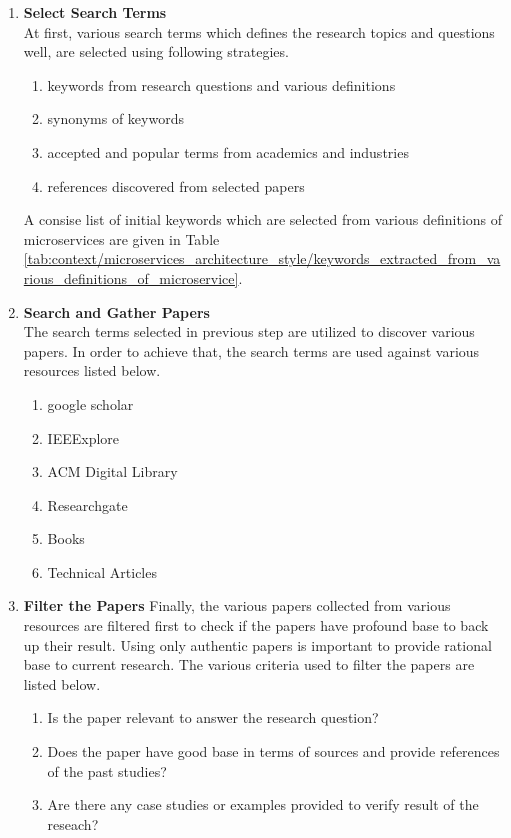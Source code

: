 \begin{enumerate}
\item \textbf{Select Search Terms}\\
At first, various search terms which defines the research topics and questions well, are selected using following strategies.
\begin{enumerate}
\item keywords from research questions and various definitions
\item synonyms of keywords
\item accepted and popular terms from academics and industries
\item references discovered from selected papers
\end{enumerate}
A consise list of initial keywords which are selected from various definitions of microservices are given in Table \ref{tab:context/microservices_architecture_style/keywords_extracted_from_various_definitions_of_microservice}.
\item \textbf{Search and Gather Papers}\\
The search terms selected in previous step are utilized to discover various papers. In order to achieve that, the search terms are used against various resources listed below.
\begin{enumerate}
\item google scholar
\item IEEExplore
\item ACM Digital Library
\item Researchgate
\item Books
\item Technical Articles
\end{enumerate}
\item \textbf{Filter the Papers}
Finally, the various papers collected from various resources are filtered first to check if the papers have profound base to back up their result. Using only authentic papers is important to provide rational base to current research. The various criteria used to filter the papers are listed below.
\begin{enumerate}
\item Is the paper relevant to answer the research question?
\item Does the paper have good base in terms of sources and provide references of the past studies? 
\item Are there any case studies or examples provided to verify result of the reseach?
\end{enumerate}
\end{enumerate}

